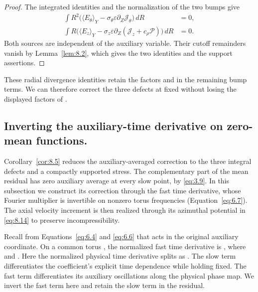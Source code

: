 \begin{proof}
The integrated identities and the normalization of the two bumps give
\begin{align*}
\int R^2\bigl(\langle E_\theta\rangle_Y
  -\sigma_\theta\varepsilon\partial_Z\mathcal J_\theta\bigr)\,dR&=0,\\
\int R\bigl(\langle E_z\rangle_Y
  -\sigma_z\varepsilon\partial_Z(\mathcal J_z+c_\rho\mathcal P)\bigr)\,dR&=0.
\end{align*}
Both sources are independent of the auxiliary variable. Their cutoff remainders vanish by
Lemma~\ref{lem:8.2}, which gives the two identities and the support assertions.
\end{proof}

These radial divergence identities retain the factors
 and
 in the remaining bump
terms. We can therefore correct the three defects at fixed  without
losing the displayed factors of .

\subsection{Inverting the auxiliary-time derivative on zero-mean functions.}\label{sec:8.5}
Corollary~\ref{cor:8.5} reduces the auxiliary-averaged correction to the three integral defects and a
compactly supported stress. The complementary part
 of the mean residual has zero auxiliary average at
every slow point, by \eqref{eq:3.9}. In this subsection we construct its correction through the fast
time derivative, whose Fourier multiplier is invertible on nonzero torus frequencies
(Equation~\eqref{eq:6.7}). The axial velocity increment is then realized through its azimuthal
potential in \eqref{eq:8.14} to preserve incompressibility.

Recall from Equations~\eqref{eq:6.4} and \eqref{eq:6.6} that
 acts in the original auxiliary coordinate.
On a common torus , the normalized fast time derivative is
, where
 and
. Here the normalized physical time derivative splits
as . The slow term
 differentiates the coefficient's explicit time
dependence while holding  fixed. The fast term
 differentiates its auxiliary oscillations along the physical
phase map. We invert the fast term here and retain the slow term in the residual.

